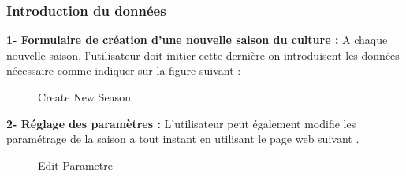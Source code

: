 \subsubsection{Introduction du données }
\textbf{1-  Formulaire de création d’une nouvelle saison du culture :}
\newline
A chaque nouvelle saison, l’utilisateur doit initier cette dernière on introduisent \newline les données nécessaire comme indiquer sur la figure suivant :

\begin{figure}[hbt]
\centering
\right
\label{fig:Create New Season}

  \caption{Create New Season}
\end{figure}


\newpage
\textbf{2-  Réglage des paramètres :}
\newline
L’utilisateur peut également modifie les paramétrage de la saison a tout instant en utilisant le page web suivant  .

\begin{figure}[hbt]
\centering
\right
\label{fig:Edit Parametre}

  \caption{Edit Parametre}
\end{figure}

